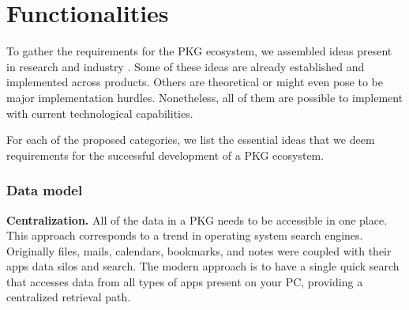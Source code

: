 

\section{Functionalities}

To gather the requirements for the PKG ecosystem, we assembled ideas present in research and industry \cite{Bush1945Memex, Davies2005Memex60, Matuschak2019TTFT,jones2007PIM}. Some of these ideas are already established and implemented across products. Others are theoretical or might even pose to be major implementation hurdles. Nonetheless, all of them are possible to implement with current technological capabilities.

For each of the proposed categories, we list the essential ideas that we deem requirements for the successful development of a PKG ecosystem.

\subsubsection*{Data model}
 
\textbf{Centralization.} All of the data in a PKG needs to be accessible in one place. This approach corresponds to a trend in operating system search engines. Originally files, mails, calendars, bookmarks, and notes were coupled with their apps data silos and search. The modern approach is to have a single quick search that accesses data from all types of apps present on your PC, providing a centralized retrieval path.

